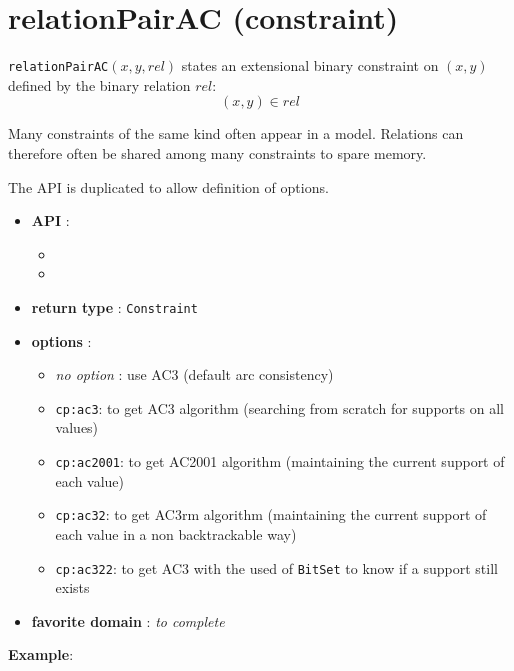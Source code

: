 \label{relationpairac}
\hypertarget{relationpairac}{}

\section{relationPairAC (constraint)}\label{relationpairac:relationpairacconstraint}\hypertarget{relationpairac:relationpairacconstraint}{}
\begin{notedef}
  \texttt{relationPairAC}$(x,y,rel)$ states an extensional binary constraint on $(x,y)$ defined by the binary relation $rel$:
$$(x,y)\in rel$$
\end{notedef}
Many constraints of the same kind often appear in a model. Relations can therefore often be shared among many constraints to spare memory.

The API is duplicated to allow definition of options.

\begin{itemize}
	\item \textbf{API} :
	\begin{itemize}
		\item {}
		\item {}
	\end{itemize}
	\item \textbf{return type} : \texttt{Constraint}
	\item \textbf{options} :
	\begin{itemize}
		\item \emph{no option} : use AC3 (default arc consistency)
		\item \texttt{cp:ac3}: to get AC3 algorithm (searching from scratch for supports on all values)
		\item \texttt{cp:ac2001}: to get AC2001 algorithm (maintaining the current support of each value)
		\item \texttt{cp:ac32}: to get AC3rm algorithm (maintaining the current support of each value in a non backtrackable way)
		\item \texttt{cp:ac322}: to get AC3 with the used of \texttt{BitSet} to know if a support still exists
	\end{itemize}
	\item \textbf{favorite domain} : \emph{to complete}
\end{itemize}

\textbf{Example}:



